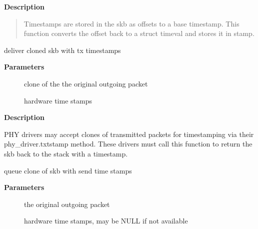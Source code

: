 \documentclass[a4paper,8pt,english]{sphinxmanual}
\begin{document}
\textbf{Description}
\begin{quote}

Timestamps are stored in the skb as offsets to a base timestamp.
This function converts the offset back to a struct timeval and stores
it in stamp.
\end{quote}

\begin{fulllineitems}
\label{networking/kapi:c.skb_complete_tx_timestamp}
deliver cloned skb with tx timestamps

\end{fulllineitems}


\textbf{Parameters}
\begin{description}
\item[{}] \leavevmode
clone of the the original outgoing packet

\item[{}] \leavevmode
hardware time stamps

\end{description}

\textbf{Description}

PHY drivers may accept clones of transmitted packets for
timestamping via their phy\_driver.txtstamp method. These drivers
must call this function to return the skb back to the stack with a
timestamp.

\begin{fulllineitems}
\label{networking/kapi:c.skb_tstamp_tx}
queue clone of skb with send time stamps

\end{fulllineitems}


\textbf{Parameters}
\begin{description}
\item[{}] \leavevmode
the original outgoing packet

\item[{}] \leavevmode
hardware time stamps, may be NULL if not available

\end{description}
\end{document}
